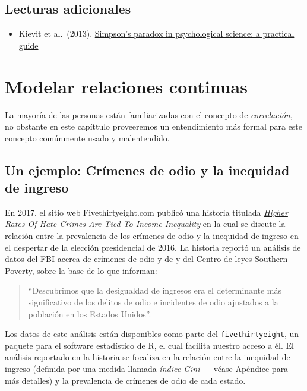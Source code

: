 \documentclass[
  12pt,
]{book}
\providecommand{\tightlist}{%
  \setlength{\itemsep}{0pt}\setlength{\parskip}{0pt}}
\begin{document}
\hypertarget{lecturas-adicionales}{%
\section{Lecturas adicionales}\label{lecturas-adicionales}}

\begin{itemize}
\tightlist
\item
  Kievit et al.~(2013). \href{https://www.frontiersin.org/articles/10.3389/fpsyg.2013.00513/full}{Simpson's paradox in psychological science: a practical guide}
\end{itemize}

\hypertarget{modeling-continuous-relationships}{%
\chapter{Modelar relaciones continuas}\label{modeling-continuous-relationships}}

La mayoría de las personas están familiarizadas con el concepto de \emph{correlación}, no obstante en este capíttulo proveeremos un entendimiento más formal para este concepto comúnmente usado y malentendido.

\hypertarget{un-ejemplo-cruxedmenes-de-odio-y-la-inequidad-de-ingreso}{%
\section{Un ejemplo: Crímenes de odio y la inequidad de ingreso}\label{un-ejemplo-cruxedmenes-de-odio-y-la-inequidad-de-ingreso}}

En 2017, el sitio web Fivethirtyeight.com publicó una historia titulada \href{https://fivethirtyeight.com/features/higher-rates-of-hate-crimes-are-tied-to-income-inequality/}{\emph{Higher Rates Of Hate Crimes Are Tied To Income Inequality}} en la cual se discute la relación entre la prevalencia de los crímenes de odio y la inequidad de ingreso en el despertar de la elección presidencial de 2016. La historia reportó un análisis de datos del FBI acerca de crímenes de odio y de y del Centro de leyes Southern Poverty, sobre la base de lo que informan:

\begin{quote}
``Descubrimos que la desigualdad de ingresos era el determinante más significativo de los delitos de odio e incidentes de odio ajustados a la población en los Estados Unidos''.
\end{quote}

Los datos de este análisis están disponibles como parte del \texttt{fivethirtyeight}, un paquete para el software estadístico de R, el cual facilita nuestro acceso a él. El análisis reportado en la historia se focaliza en la relación entre la inequidad de ingreso (definida por una medida llamada \emph{índice Gini} --- véase Apéndice para más detalles) y la prevalencia de crímenes de odio de cada estado.
\end{document}
